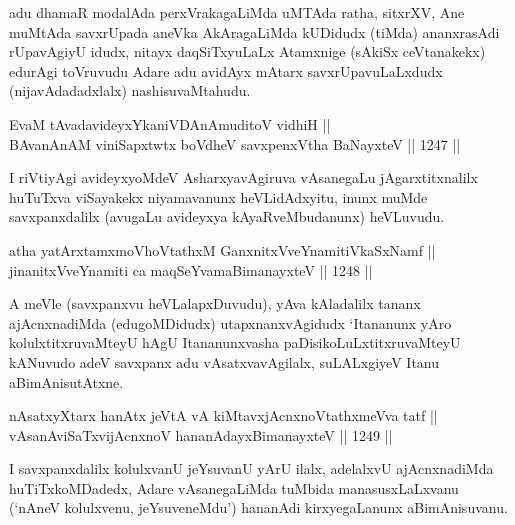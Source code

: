 \begin{artha}
adu dhamaR modalAda perxVrakagaLiMda uMTAda ratha, sitxrXV, Ane muMtAda savxrUpada aneVka AkAragaLiMda kUDidudx (tiMda) ananxrasAdi rUpavAgiyU idudx, nitayx daqSiTxyuLaLx Atamxnige (sAkiSx ceVtanakekx) edurAgi toVruvudu Adare adu avidAyx mAtarx savxrUpavuLaLxdudx (nijavAdadadxlalx) nashisuvaMtahudu.
\end{artha}

\begin{shl}
EvaM tAvadavideyxYkaniVDAnAmuditoV vidhiH || \\
BAvanAnAM viniSapxtwtx boVdheV savxpenxV\s tha BaNayxteV \hfill || 1247 ||  
\end{shl}

\begin{artha}
I riVtiyAgi avideyxyoMdeV AsharxyavAgiruva vAsanegaLu jAgarxtitxnalilx huTuTxva viSayakekx niyamavanunx heVLidAdxyitu, inunx muMde savxpanxdalilx (avugaLu avideyxya kAyaRveMbudanunx) heVLuvudu.
\end{artha}


\begin{shl}
atha yatArx\s \s tamxmoVhoVtathxM GanxnitxVveYnamitiVkaSxNamf || \\
jinanitxVveYnamiti ca maqSeYvamaBimanayxteV \hfill || 1248 ||  
\end{shl}

\begin{artha}
A meVle (savxpanxvu heVLalapxDuvudu), yAva kAladalilx tananx ajAcnxnadiMda (edugoMDidudx) utapxnanxvAgidudx `Itananunx yAro kolulxtitxruvaMteyU hAgU Itananunxvasha paDisikoLuLxtitxruvaMteyU kANuvudo adeV savxpanx adu vAsatxvavAgilalx, suLALxgiyeV Itanu aBimAnisutAtxne.
\end{artha}


\begin{shl}
nAsatxyXtarx hanAtx jeVtA vA kiMtavxjAcnxnoVtathxmeVva tatf || \\
vAsanAviSaTxvijAcnxnoV hananAdayxBimanayxteV \hfill || 1249 ||  
\end{shl}

\begin{artha}
I savxpanxdalilx kolulxvanU jeYsuvanU yArU ilalx, adelalxvU ajAcnxnadiMda huTiTxkoMDadedx, Adare vAsanegaLiMda tuMbida manasusxLaLxvanu (`nAneV kolulxvenu, jeYsuveneMdu') hananAdi kirxyegaLanunx aBimAnisuvanu.
\end{artha}

